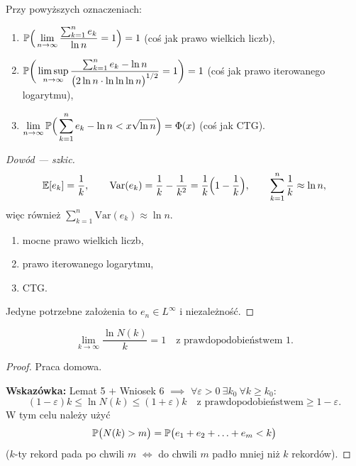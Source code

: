 \documentclass[dvipsnames]{book}
\begin{document}
\begin{wniosek}
Przy powyższych oznaczeniach:
\begin{enumerate}
  \item $\displaystyle
    \P\Big(\lim_{n \to \infty} \frac{\sum_{k=1}^{n} e_k}{\ln n} = 1\Big) = 1$
    \hfill (coś jak prawo wielkich liczb),
  \item $\displaystyle
    \P\bigg(\limsup_{n \to \infty}
      \frac{\sum_{k=1}^{n} e_k - \ln n}{\big(2 \ln n \cdot \ln\ln\ln n\big)^{1/2}}
      = 1\bigg) = 1$
    \hfill (coś jak prawo iterowanego logarytmu),
  \item $\displaystyle
    \lim_{n \to \infty} \P\Big(\sum_{k=1}^{n} e_k - \ln n < x \sqrt{\ln n}\Big)
    = \Phi(x)$
    \hfill (coś jak CTG).
\end{enumerate}
\end{wniosek}

\begin{proof}[Dowód --- szkic]
\[
  \E[e_k] = \frac{1}{k}, \qquad
  \mathrm{Var}(e_k) = \frac{1}{k} - \frac{1}{k^2} = \frac{1}{k}\Big(1 - \frac{1}{k}\Big), \qquad
  \sum_{k=1}^{n} \frac{1}{k} \approx \ln n,
\]
więc również $\sum_{k=1}^n \mathrm{Var}(e_k) \approx \ln n$.
\begin{enumerate}
  \item mocne prawo wielkich liczb,
  \item prawo iterowanego logarytmu,
  \item CTG.
\end{enumerate}
Jedyne potrzebne założenia to $e_n \in L^\infty$ i niezależność.
\end{proof}

\hrulefill

\begin{twierdzenie}
\[
  \lim_{k \to \infty} \frac{\ln N(k)}{k} = 1
  \quad \text{z prawdopodobieństwem } 1.
\]
\end{twierdzenie}

\begin{proof}
Praca domowa.

\textbf{Wskazówka:} Lemat 5 $+$ Wniosek 6 $\implies$
$\forall \varepsilon > 0\ \exists k_0\ \forall k \geq k_0$:
\[
  (1 - \varepsilon) k \leq \ln N(k) \leq (1 + \varepsilon) k
  \quad \text{z prawdopodobieństwem} \geq 1 - \varepsilon.
\]
W tym celu należy użyć
\[
  \P\big(N(k) > m\big) = \P\big(e_1 + e_2 + \ldots + e_m < k\big)
\]
($k$-ty rekord pada po chwili $m$ $\iff$ do chwili $m$ padło mniej niż $k$
rekordów).
\end{proof}
\end{document}
